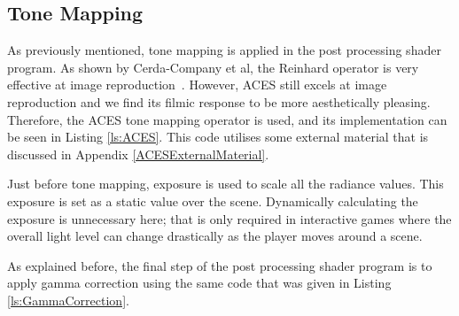 
\subsection{Tone Mapping} \label{ToneMappingImplementation}

As previously mentioned, tone mapping is applied in the post processing shader program. As shown by Cerda-Company et al, the Reinhard operator is very effective at image reproduction~\cite{ComparingToneMappingOperators}. However, ACES still excels at image reproduction and we find its filmic response to be more aesthetically pleasing. Therefore, the ACES tone mapping operator is used, and its implementation can be seen in Listing \ref{ls:ACES}. This code utilises some external material that is discussed in Appendix \ref{ACESExternalMaterial}.

Just before tone mapping, exposure is used to scale all the radiance values. This exposure is set as a static value over the scene. Dynamically calculating the exposure is unnecessary here; that is only required in interactive games where the overall light level can change drastically as the player moves around a scene.

As explained before, the final step of the post processing shader program is to apply gamma correction using the same code that was given in Listing \ref{ls:GammaCorrection}.

